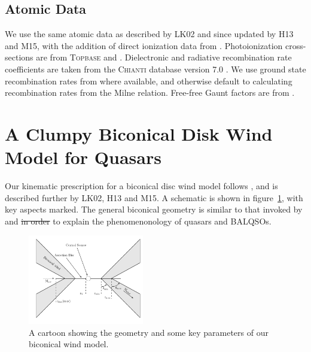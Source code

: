 \documentclass[useAMS,usenatbib]{mn2e_x}
\providecommand{\DIFdel}[1]{{\protect\color{red}\sout{#1}}}                      %
\providecommand{\DIFdelbegin}{} %
\providecommand{\DIFdelend}{} %
\begin{document}


\subsection{Atomic Data}

We use the same atomic data as described by LK02 and since updated by H13 and M15, 
with the addition of direct ionization data from \cite{dere2007}. 
Photoionization cross-sections are from \textsc{Topbase} \citep{cunto1993} and  \cite{vfky}.
Dielectronic and radiative recombination rate coefficients are taken from 
the \textsc{Chianti} database version 7.0 \citep{dere1997,landi2012}.
We use ground state recombination rates from \cite{badnell2006} where available,
and otherwise default to calculating recombination rates from the Milne
relation. Free-free Gaunt factors are from \cite{sutherland1998}.





\DIFdelbegin %

\DIFdelend %
\DIFdelbegin %

\DIFdelend %

\section{A Clumpy Biconical Disk Wind Model for Quasars}

Our kinematic prescription for a biconical disc wind model
follows \cite{SV93}, and is described further by
LK02, H13 and M15. A schematic is shown in figure~\ref{fig:cartoon},
with key aspects marked. The general biconical
geometry is similar to that invoked by \cite{MCGV95} and 
\cite{elvis2000} \DIFdelbegin \DIFdel{in order }\DIFdelend to explain the phenomenonology
of quasars and BALQSOs.

\begin{figure} 
\centering
\includegraphics[width=0.45\textwidth]{figures/fig2_cartoon.png}
\caption
{
A cartoon showing the geometry and some key parameters of
our biconical wind model.
}
\label{fig:cartoon}
\end{figure} 
\end{document}
